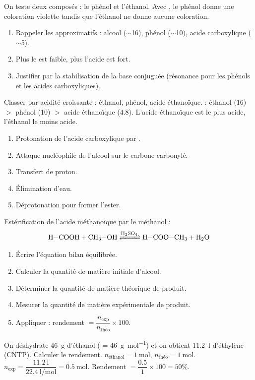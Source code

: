 \begin{exemple}
On teste deux composés : le phénol et l'éthanol. Avec , le phénol donne une coloration violette tandis que l'éthanol ne donne aucune coloration.
\end{exemple}

\begin{enumerate}
\item Rappeler les  approximatifs : alcool ($\sim$16), phénol ($\sim$10), acide carboxylique ($\sim$5).
\item Plus le  est faible, plus l'acide est fort.
\item Justifier par la stabilisation de la base conjuguée (résonance pour les phénols et les acides carboxyliques).
\end{enumerate}

\begin{exemple}
Classer par acidité croissante : éthanol, phénol, acide éthanoïque.
 : éthanol (\num{16}) $>$ phénol (\num{10}) $>$ acide éthanoïque (\num{4.8}). L'acide éthanoïque est le plus acide, l'éthanol le moins acide.
\end{exemple}

\begin{enumerate}
\item Protonation de l'acide carboxylique par .
\item Attaque nucléophile de l'alcool sur le carbone carbonylé.
\item Transfert de proton.
\item Élimination d'eau.
\item Déprotonation pour former l'ester.
\end{enumerate}

\begin{exemple}
Estérification de l'acide méthanoïque par le méthanol :
\[\ce{H-COOH + CH3-OH <=>[H2SO4] H-COO-CH3 + H2O}\]
\end{exemple}

\begin{enumerate}
\item Écrire l'équation bilan équilibrée.
\item Calculer la quantité de matière initiale d'alcool.
\item Déterminer la quantité de matière théorique de produit.
\item Mesurer la quantité de matière expérimentale de produit.
\item Appliquer : rendement $= \dfrac{n_{\text{exp}}}{n_{\text{théo}}} \times 100$.
\end{enumerate}

\begin{exemple}
On déshydrate \SI{46}{\gram} d'éthanol ( = \SI{46}{\gram\per\mol}) et on obtient \SI{11.2}{\litre} d'éthylène (CNTP). Calculer le rendement.
$n_{\text{éthanol}} = \SI{1}{\mol}$, $n_{\text{théo}} = \SI{1}{\mol}$.
$n_{\text{exp}} = \dfrac{\SI{11.2}{\litre}}{\SI{22.4}{\litre\per\mol}} = \SI{0.5}{\mol}$.
Rendement $= \dfrac{0.5}{1} \times 100 = 50\%$.
\end{exemple}